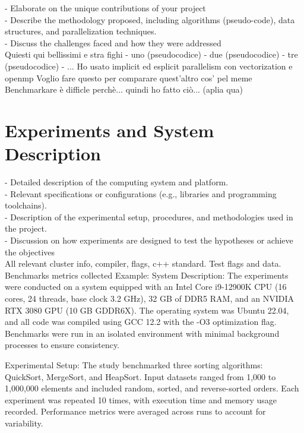 \documentclass[conference]{IEEEtran}
\begin{document}
- Elaborate on the unique contributions of your project \\
- Describe the methodology proposed, including algorithms (pseudo-code),
data structures, and parallelization techniques. \\
- Discuss the challenges faced and how they were addressed \\



\iffalse
Remember: write
- what you did (contribution): high level overview like "hey, i want to test different vectorization ond parallelization implementations"
- how you did it (methodology): we benchmarked algorithm A ... (all the pseudocodes). Whay we mesured

\fi

Quiesti qui bellissimi e stra fighi
- uno (pseudocodice)
- due (pseudocodice)
- tre (pseudocodice)
- ...
Ho usato implicit ed esplicit parallelism con vectorization e openmp
Voglio fare questo per comparare quest'altro cos' pel meme
Benchmarkare è difficle perchè... quindi ho fatto ciò... (aplia qua)


\section{Experiments and System Description}

- Detailed description of the computing system and platform. \\
- Relevant specifications or configurations (e.g., libraries
and programming toolchains). \\
- Description of the experimental setup, procedures, and
methodologies used in the project. \\
- Discussion on how experiments are designed to test the hypotheses
or achieve the objectives \\


All relevant cluster info, compiler, flags, c++ standard. Test flags and data. Benchmarks metrics collected
Example:
System Description:
The experiments were conducted on a system equipped with an Intel Core i9-12900K CPU (16 cores, 24 threads, base clock 3.2 GHz), 32 GB of DDR5 RAM, and an NVIDIA RTX 3080 GPU (10 GB GDDR6X). The operating system was Ubuntu 22.04, and all code was compiled using GCC 12.2 with the -O3 optimization flag. Benchmarks were run in an isolated environment with minimal background processes to ensure consistency.

Experimental Setup:
The study benchmarked three sorting algorithms: QuickSort, MergeSort, and HeapSort. Input datasets ranged from 1,000 to 1,000,000 elements and included random, sorted, and reverse-sorted orders. Each experiment was repeated 10 times, with execution time and memory usage recorded. Performance metrics were averaged across runs to account for variability.
\end{document}
